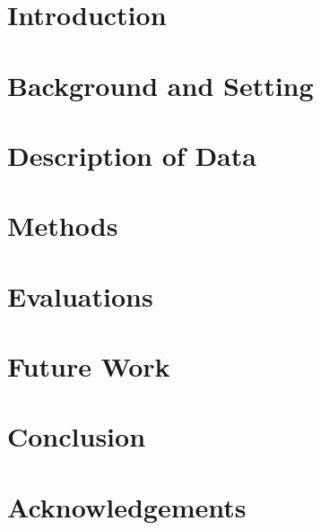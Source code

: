 \section{Introduction} 

\section {Background and Setting}

\section {Description of Data}

\section{Methods}

\section{Evaluations}

\section{Future Work}

\section{Conclusion}

\section*{Acknowledgements}
